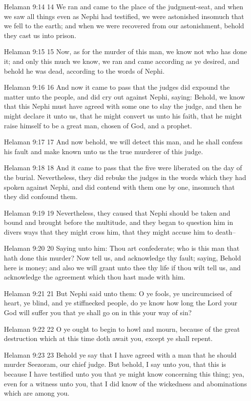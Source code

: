 Helaman 9:14
 14 We ran and came to the place of the judgment-seat, and when
we saw all things even as Nephi had testified, we were astonished
insomuch that we fell to the earth; and when we were recovered
from our astonishment, behold they cast us into prison.

Helaman 9:15
 15 Now, as for the murder of this man, we know not who has done
it; and only this much we know, we ran and came according as ye
desired, and behold he was dead, according to the words of Nephi.

Helaman 9:16
 16 And now it came to pass that the judges did expound the
matter unto the people, and did cry out against Nephi, saying:
Behold, we know that this Nephi must have agreed with some one to
slay the judge, and then he might declare it unto us, that he
might convert us unto his faith, that he might raise himself to
be a great man, chosen of God, and a prophet.

Helaman 9:17
 17 And now behold, we will detect this man, and he shall confess
his fault and make known unto us the true murderer of this judge.

Helaman 9:18
 18 And it came to pass that the five were liberated on the day
of the burial. Nevertheless, they did rebuke the judges in the
words which they had spoken against Nephi, and did contend with
them one by one, insomuch that they did confound them.

Helaman 9:19
 19 Nevertheless, they caused that Nephi should be taken and
bound and brought before the multitude, and they began to
question him in divers ways that they might cross him, that they
might accuse him to death--

Helaman 9:20
 20 Saying unto him: Thou art confederate; who is this man that
hath done this murder? Now tell us, and acknowledge thy fault;
saying, Behold here is money; and also we will grant unto thee
thy life if thou wilt tell us, and acknowledge the agreement
which thou hast made with him.

Helaman 9:21
 21 But Nephi said unto them: O ye fools, ye uncircumcised of
heart, ye blind, and ye stiffnecked people, do ye know how long
the Lord your God will suffer you that ye shall go on in this
your way of sin?

Helaman 9:22
 22 O ye ought to begin to howl and mourn, because of the great
destruction which at this time doth await you, except ye shall
repent.

Helaman 9:23
 23 Behold ye say that I have agreed with a man that he should
murder Seezoram, our chief judge. But behold, I say unto you,
that this is because I have testified unto you that ye might know
concerning this thing; yea, even for a witness unto you, that I
did know of the wickedness and abominations which are among you.

